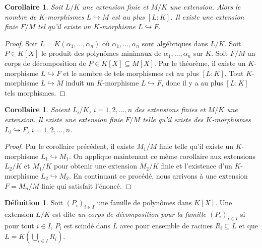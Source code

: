 \documentclass{article}
\theoremstyle{plain}
\newtheorem{corollary}[theorem]{Corollaire}
\theoremstyle{definition}
\newtheorem{definition}[theorem]{Définition}
\theoremstyle{remark}
\begin{document}
\begin{corollary}
    Soit $L/K$ une extension finie et $M/K$ une extension. Alors le nombre de $K$-morphismes $L \hookrightarrow M$ est au plus $[L : K]$. Il existe une extension finie $F/M$ tel qu'il existe un $K$-morphisme $L \hookrightarrow F$.
    \begin{center}
    \end{center}
\end{corollary}

\begin{proof}
    Soit $L = K(\alpha_1,\dots,\alpha_n)$ où $\alpha_1,\dots,\alpha_n$ sont algébriques dans $L/K$. Soit $P \in K[X]$ le produit des polynômes minimaux de $\alpha_1,\dots,\alpha_n$ sur $K$. Soit $F/M$ un corps de décomposition de $P \in K[X] \subseteq M[X]$. Par le théorème, il existe un $K$-morphisme $L \hookrightarrow F$ et le nombre de tels morphismes est au plus $[L : K]$. Tout $K$-morphisme $L \hookrightarrow M$ induit un $K$-morphisme $L \hookrightarrow F$, donc il y a au plus $[L : K]$ tels morphismes.
\end{proof}

\begin{corollary}
    Soient $L_i/K$, $i = 1,2,\dots,n$ des extensions finies et $M/K$ une extension. Il existe une extension finie $F/M$ telle qu'il existe des $K$-morphismes $L_i \hookrightarrow F$, $i = 1,2,\dots,n$. 
\end{corollary}

\begin{proof}
    Par le corollaire précédent, il existe $M_1/M$ finie telle qu'il existe un $K$-morphisme $L_1 \hookrightarrow M_1$. On applique maintenant ce même corollaire aux extensions $L_2/K$ et $M_1/K$ pour obtenir une extension $M_2/K$ finie et l'existence d'un $K$-morphisme $L_2 \hookrightarrow M_2$. En continuant ce procédé, nous arrivons à une extension $F = M_n/M$ finie qui satisfait l'énoncé.
\end{proof}

\begin{definition}
    Soit $(P_i)_{i\in I}$ une famille de polynômes dans $K[X]$. Une extension $L/K$ est dite \emph{un corps de décomposition pour la famille $(P_i)_{i\in I}$} si pour tout $i \in I$, $P_i$ est scindé dans $L$ avec pour ensemble de racines $R_i \subseteq L$ et que $L = K \left(\bigcup\limits_{i\in I} R_i\right)$.
\end{definition}
\end{document}
